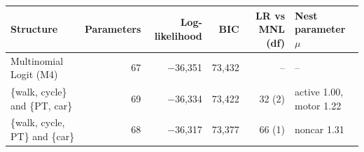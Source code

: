 \begin{tabular}{lrrrrl}
\toprule
Structure & Parameters & Log-likelihood & BIC & LR vs MNL (df) & Nest parameter $\mu$ \\
\midrule
Multinomial Logit (M4) & 67 & $-$36,351 & 73,432 & -- & -- \\
\{walk, cycle\} and \{PT, car\} & 69 & $-$36,334 & 73,422 & 32 (2) & active 1.00, motor 1.22 \\
\{walk, cycle, PT\} and \{car\} & 68 & $-$36,317 & 73,377 & 66 (1) & noncar 1.31 \\
\bottomrule
\end{tabular}
